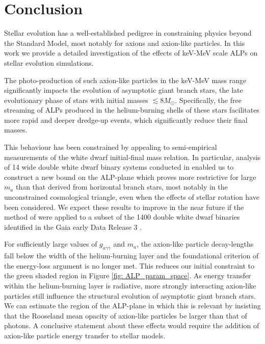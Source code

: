 \section{Conclusion}
\label{sec: Section 6}



Stellar evolution has a well-established pedigree in constraining physics beyond the Standard Model, most notably for axions and axion-like particles. In this work we provide a detailed investigation of the effects of keV-MeV scale ALPs on stellar evolution simulations. 




The photo-production of such axion-like particles in the keV-MeV mass range significantly impacts the evolution of asymptotic giant branch stars, the late evolutionary phase of stars with initial masses $\lesssim8M_{\odot}$. Specifically, the free streaming of ALPs produced in the helium-burning shells of these stars facilitates more rapid and deeper dredge-up events, which significantly reduce their final masses.



This behaviour has been constrained by appealing to semi-empirical measurements of the white dwarf initial-final mass relation. In particular, analysis of 14 wide double white dwarf binary systems conducted in \cite{Andrews} enabled us to construct a new bound on the ALP-plane which proves more restrictive for large $m_a$ than that derived from horizontal branch stars, most notably in the unconstrained cosmological triangle, even when the effects of stellar rotation have been considered. We expect these results to improve in the near future if the method of \cite{Andrews} were applied to a subset of the 1400 double white dwarf binaries identified in the Gaia early Data Release 3 \cite{2021arXiv210105282E}.





For sufficiently large values of $g_{a\gamma\gamma}$ and $m_a$, the axion-like particle decay-lengths fall below the width of the helium-burning layer and the foundational criterion of the energy-loss argument is no longer met. This reduces our initial constraint to the green shaded region in Figure \ref{fig: ALP_param_space}. As energy transfer within the helium-burning layer is radiative, more strongly interacting axion-like particles still influence the structural evolution of asymptotic giant branch stars. We can estimate the region of the ALP-plane in which this is relevant by insisting that the Rooseland mean opacity of axion-like particles be larger than that of photons. A conclusive statement about these effects would require the addition of axion-like particle energy transfer to stellar models.




